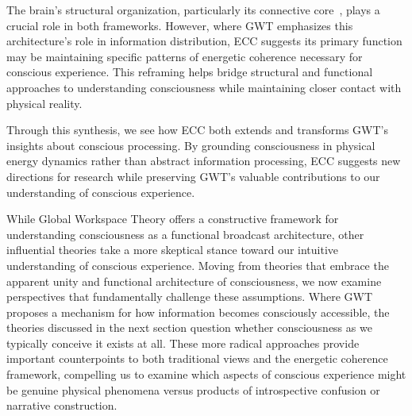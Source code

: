 The brain's structural organization, particularly its connective core~\cite{Shanahan2012, bullmore2012economy}, plays a crucial role in both frameworks. However, where GWT emphasizes this architecture's role in information distribution, ECC suggests its primary function may be maintaining specific patterns of energetic coherence necessary for conscious experience. This reframing helps bridge structural and functional approaches to understanding consciousness while maintaining closer contact with physical reality.

Through this synthesis, we see how ECC both extends and transforms GWT's insights about conscious processing. By grounding consciousness in physical energy dynamics rather than abstract information processing, ECC suggests new directions for research while preserving GWT's valuable contributions to our understanding of conscious experience.

While Global Workspace Theory offers a constructive framework for understanding consciousness as a functional broadcast architecture, other influential theories take a more skeptical stance toward our intuitive understanding of conscious experience. Moving from theories that embrace the apparent unity and functional architecture of consciousness, we now examine perspectives that fundamentally challenge these assumptions. Where GWT proposes a mechanism for how information becomes consciously accessible, the theories discussed in the next section question whether consciousness as we typically conceive it exists at all. These more radical approaches provide important counterpoints to both traditional views and the energetic coherence framework, compelling us to examine which aspects of conscious experience might be genuine physical phenomena versus products of introspective confusion or narrative construction.
